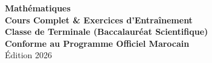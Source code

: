 \documentclass[11pt, a4paper, twoside, openright]{book}
\begin{document}
\frontmatter

\begin{titlepage}
  \centering
  \vspace*{2cm}
  {\Huge\bfseries\sffamily\color{defcolor} Mathématiques}\\[0.5cm]
  {\Large\bfseries\sffamily\color{thcolor} Cours Complet \& Exercices d'Entraînement}\\[1.5cm]
  {\large\bfseries\sffamily Classe de Terminale (Baccalauréat Scientifique)}\\[3cm]
  
  \vfill
  {\large\bfseries\sffamily Conforme au Programme Officiel Marocain}\\[0.5cm]
  {\large\sffamily Édition 2026}
\end{titlepage}

\tableofcontents
\newpage

\mainmatter











\end{document}
